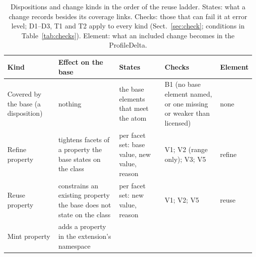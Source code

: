 \begin{table}[t]
  \caption{Dispositions and change kinds in the order of the reuse ladder. States: what a change records besides
    its coverage links. Checks: those that can fail it at error level; D1--D3, T1 and T2 apply to every kind
    (Sect.~\ref{sec:check}; conditions in Table~\ref{tab:checks}). Element: what an included change becomes in
    the ProfileDelta.}
  \label{tab:kinds}
  \centering\scriptsize
  \setlength{\tabcolsep}{3pt}
  \begin{tabular}{@{}>{\raggedright\arraybackslash}p{1.5cm}>{\raggedright\arraybackslash}p{3.0cm}%
      >{\raggedright\arraybackslash}p{2.6cm}>{\raggedright\arraybackslash}p{3.1cm}%
      >{\raggedright\arraybackslash}p{1.15cm}@{}}
    \toprule
    Kind & Effect on the base & States & Checks & Element\\
    \midrule
    Covered by the base (a disposition) %
      & nothing
      & the base elements that meet the atom
      & B1 (no base element named, or one missing or weaker than licensed) %
      & none\\
    Refine property %
      & tightens facets of a property the base states on the class
      & per facet set: base value, new value, reason %
      & V1; V2 (range only); V3; V5 %
      & refine\\
    Reuse property %
      & constrains an existing property the base does not state on the class
      & per facet set: new value, reason %
      & V1; V2; V5 %
      & reuse\\
    Mint property %
      & adds a property in the extension's namespace

\end{tabular}
\end{table}
